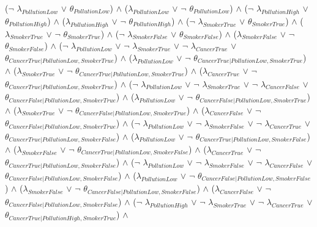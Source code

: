 \begin{center}
($\neg$ $\lambda_{PollutionLow}$ $\lor$ $\theta_{PollutionLow}$) $\land$ 
 ($\lambda_{PollutionLow}$ $\lor$ $\neg$ $\theta_{PollutionLow}$) $\land$ 
 ($\neg$ $\lambda_{PollutionHigh}$ $\lor$ $\theta_{PollutionHigh}$) $\land$ 
 ($\lambda_{PollutionHigh}$ $\lor$ $\neg$ $\theta_{PollutionHigh}$) $\land$ 
 ($\neg$ $\lambda_{SmokerTrue}$ $\lor$ $\theta_{SmokerTrue}$) $\land$ 
 ($\lambda_{SmokerTrue}$ $\lor$ $\neg$ $\theta_{SmokerTrue}$) $\land$ 
 ($\neg$ $\lambda_{SmokerFalse}$ $\lor$ $\theta_{SmokerFalse}$) $\land$ 
 ($\lambda_{SmokerFalse}$ $\lor$ $\neg$ $\theta_{SmokerFalse}$) $\land$ 
 ($\neg$ $\lambda_{PollutionLow}$ $\lor$ $\neg$ $\lambda_{SmokerTrue}$ $\lor$ $\neg$ $\lambda_{CancerTrue}$ $\lor$ $\theta_{CancerTrue|PollutionLow,SmokerTrue}$) $\land$ 
 ($\lambda_{PollutionLow}$ $\lor$ $\neg$ $\theta_{CancerTrue|PollutionLow,SmokerTrue}$) $\land$ 
 ($\lambda_{SmokerTrue}$ $\lor$ $\neg$ $\theta_{CancerTrue|PollutionLow,SmokerTrue}$) $\land$ 
 ($\lambda_{CancerTrue}$ $\lor$ $\neg$ $\theta_{CancerTrue|PollutionLow,SmokerTrue}$) $\land$ 
 ($\neg$ $\lambda_{PollutionLow}$ $\lor$ $\neg$ $\lambda_{SmokerTrue}$ $\lor$ $\neg$ $\lambda_{CancerFalse}$ $\lor$ $\theta_{CancerFalse|PollutionLow,SmokerTrue}$) $\land$ 
 ($\lambda_{PollutionLow}$ $\lor$ $\neg$ $\theta_{CancerFalse|PollutionLow,SmokerTrue}$) $\land$ 
 ($\lambda_{SmokerTrue}$ $\lor$ $\neg$ $\theta_{CancerFalse|PollutionLow,SmokerTrue}$) $\land$ 
 ($\lambda_{CancerFalse}$ $\lor$ $\neg$ $\theta_{CancerFalse|PollutionLow,SmokerTrue}$) $\land$ 
 ($\neg$ $\lambda_{PollutionLow}$ $\lor$ $\neg$ $\lambda_{SmokerFalse}$ $\lor$ $\neg$ $\lambda_{CancerTrue}$ $\lor$ $\theta_{CancerTrue|PollutionLow,SmokerFalse}$) $\land$ 
 ($\lambda_{PollutionLow}$ $\lor$ $\neg$ $\theta_{CancerTrue|PollutionLow,SmokerFalse}$) $\land$ 
 ($\lambda_{SmokerFalse}$ $\lor$ $\neg$ $\theta_{CancerTrue|PollutionLow,SmokerFalse}$) $\land$ 
 ($\lambda_{CancerTrue}$ $\lor$ $\neg$ $\theta_{CancerTrue|PollutionLow,SmokerFalse}$) $\land$ 
 ($\neg$ $\lambda_{PollutionLow}$ $\lor$ $\neg$ $\lambda_{SmokerFalse}$ $\lor$ $\neg$ $\lambda_{CancerFalse}$ $\lor$ $\theta_{CancerFalse|PollutionLow,SmokerFalse}$) $\land$ 
 ($\lambda_{PollutionLow}$ $\lor$ $\neg$ $\theta_{CancerFalse|PollutionLow,SmokerFalse}$) $\land$ 
 ($\lambda_{SmokerFalse}$ $\lor$ $\neg$ $\theta_{CancerFalse|PollutionLow,SmokerFalse}$) $\land$ 
 ($\lambda_{CancerFalse}$ $\lor$ $\neg$ $\theta_{CancerFalse|PollutionLow,SmokerFalse}$) $\land$ 
 ($\neg$ $\lambda_{PollutionHigh}$ $\lor$ $\neg$ $\lambda_{SmokerTrue}$ $\lor$ $\neg$ $\lambda_{CancerTrue}$ $\lor$ $\theta_{CancerTrue|PollutionHigh,SmokerTrue}$) $\land$ 

\end{center}

